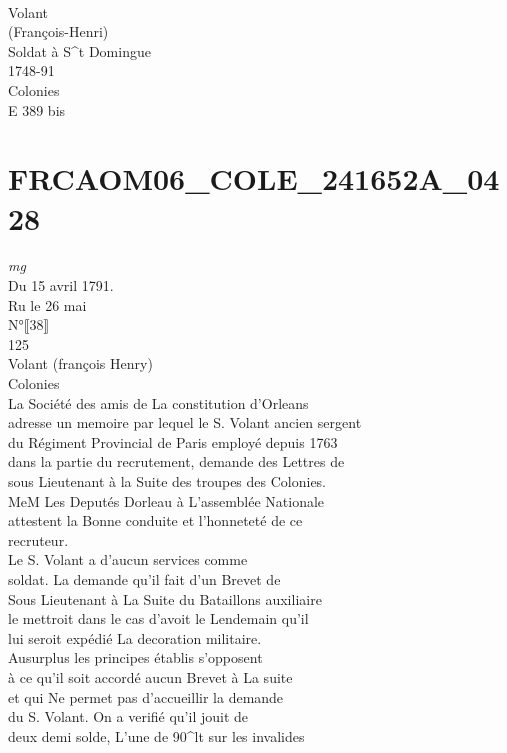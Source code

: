 \documentclass{article}
\begin{document}
\begin{pages}
\\
Volant\\
(François-Henri)\\
Soldat à S\^{}t Domingue\\
1748-91\\
Colonies\\
E 389 bis
\pend
\endnumbering\beginnumbering\section{FRCAOM06\_COLE\_241652A\_0428}
\vspace{0.5cm}\noindent
\textit{mg}
\footnotesize \\
Du 15 avril 1791.\\
Ru le 26 mai\\
N°⟦38⟧\\
125
\normalsize \pstart
\\
Volant (françois Henry)\\
Colonies\\
La Société des amis de La constitution d'Orleans\\
adresse un memoire par lequel le S. Volant ancien sergent\\
du Régiment Provincial de Paris employé depuis 1763\\
dans la partie du recrutement, demande des Lettres de\\
sous Lieutenant à la Suite des troupes des Colonies.\\
MeM Les Deputés Dorleau à L'assemblée Nationale\\
attestent la Bonne conduite et l'honneteté de ce\\
recruteur.\\
Le S. Volant a d'aucun services comme\\
soldat. La demande qu'il fait d'un Brevet de\\
Sous Lieutenant à La Suite du Bataillons auxiliaire\\
le mettroit dans le cas d'avoit le Lendemain qu'il\\
lui seroit expédié La decoration militaire.\\
Ausurplus les principes établis s'opposent\\
à ce qu'il soit accordé aucun Brevet à La suite\\
et qui Ne permet pas d'accueillir la demande\\
du S. Volant. On a verifié qu'il jouit de\\
deux demi solde, L'une de 90\^{}lt sur les invalides\\

\end{pages}
\end{document}
